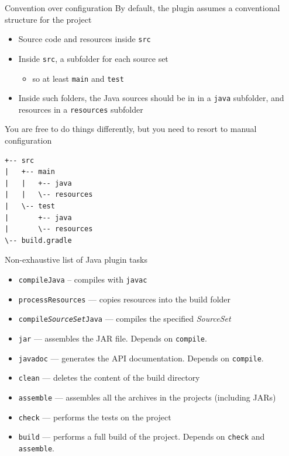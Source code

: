 \documentclass[presentation]{beamer}
\begin{document}
\begin{frame}[fragile]{Convention over configuration}
    By default, the plugin assumes a conventional structure for the project
    \begin{itemize}
        \item Source code and resources inside \texttt{src}
        \item Inside \texttt{src}, a subfolder for each source set
        \begin{itemize}
            \item so at least \texttt{main} and \texttt{test}
        \end{itemize}
        \item Inside such folders, the Java sources should be in in a \texttt{java} subfolder, and resources in a \texttt{resources} subfolder
    \end{itemize}
    You are free to do things differently, but you need to resort to manual configuration
    \begin{verbatim}
+-- src
|   +-- main
|   |   +-- java
|   |   \-- resources
|   \-- test
|       +-- java
|       \-- resources
\-- build.gradle
    \end{verbatim}
\end{frame}

\begin{frame}[fragile]{Non-exhaustive list of Java plugin tasks}
    \begin{itemize}
        \item \texttt{compileJava} -- compiles with \texttt{javac}
        \item \texttt{processResources} --- copies resources into the build folder
        \item \texttt{compile\textit{SourceSet}Java} --- compiles the specified \textit{SourceSet}
        \item \texttt{jar} --- assembles the JAR file. Depends on \texttt{compile}.
        \item \texttt{javadoc} --- generates the API documentation. Depends on \texttt{compile}.
        \item \texttt{clean} --- deletes the content of the build directory
        \item \texttt{assemble} --- assembles all the archives in the projects (including JARs)
        \item \texttt{check} --- performs the tests on the project
        \item \texttt{build} --- performs a full build of the project. Depends on \texttt{check} and \texttt{assemble}.
    \end{itemize}
\end{frame}
\end{document}
